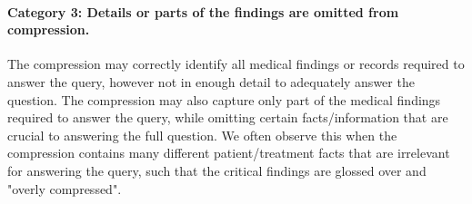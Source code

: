 \documentclass{article} %
\begin{document}
\paragraph*{Category 3: Details or parts of the findings are omitted from compression.} 
The compression may correctly identify all medical findings or records required to answer the query, however not in enough detail to adequately answer the question. The compression may also capture only part of the medical findings required to answer the query, while omitting certain facts/information that are crucial to answering the full question. We often observe this when the compression contains many different patient/treatment facts that are irrelevant for answering the query, such that the critical findings are glossed over and "overly compressed".
\end{document}
